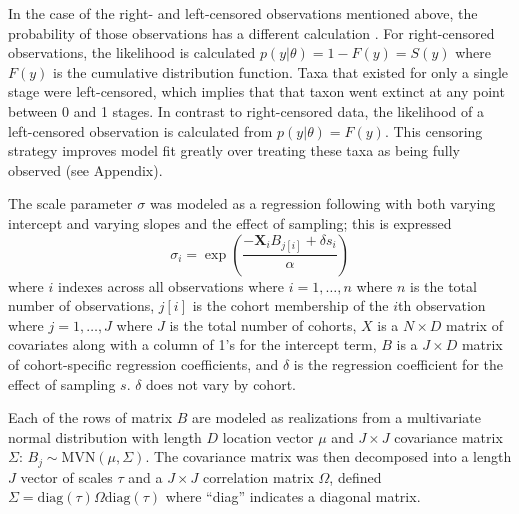 \documentclass[11pt]{article}
\begin{document}
In the case of the right- and left-censored observations mentioned above, the probability of those observations has a different calculation \citep{Klein2003}. For right-censored observations, the likelihood is calculated \(p(y | \theta) = 1 - F(y) = S(y)\) where \(F(y)\) is the cumulative distribution function. Taxa that existed for only a single stage were left-censored, which implies that that taxon went extinct at any point between 0 and 1 stages. In contrast to right-censored data, the likelihood of a left-censored observation is calculated from \(p(y | \theta) = F(y)\). This censoring strategy improves model fit greatly over treating these taxa as being fully observed (see Appendix). 

The scale parameter \(\sigma\) was modeled as a regression following \citet{Kleinbaum2005} with both varying intercept and varying slopes and the effect of sampling; this is expressed
\begin{equation}
  \sigma_{i} = \exp\left(\frac{-\mathbf{X}_{i} B_{j[i]} + \delta s_{i}}{\alpha}\right)
  \label{eq:sigma}
\end{equation}
where \(i\) indexes across all observations where \(i = 1, \dots, n\) where \(n\) is the total number of observations, \(j[i]\) is the cohort membership of the \(i\)th observation where \(j = 1, \dots, J\) where \(J\) is the total number of cohorts, \(X\) is a \(N \times D\) matrix of covariates along with a column of 1's for the intercept term, \(B\) is a \(J \times D\) matrix of cohort-specific regression coefficients, and \(\delta\) is the regression coefficient for the effect of sampling \(s\). \(\delta\) does not vary by cohort.

Each of the rows of matrix \(B\) are modeled as realizations from a multivariate normal distribution with length \(D\) location vector \(\mu\) and \(J \times J\) covariance matrix \(\Sigma\): \(B_{j} \sim \mathrm{MVN}(\mu, \Sigma)\). The covariance matrix was then decomposed into a length \(J\) vector of scales \(\tau\) and a \(J \times J\) correlation matrix \(\Omega\), defined \(\Sigma = \mathrm{diag}(\tau) \Omega \mathrm{diag}(\tau)\) where ``diag'' indicates a diagonal matrix.
\end{document}
